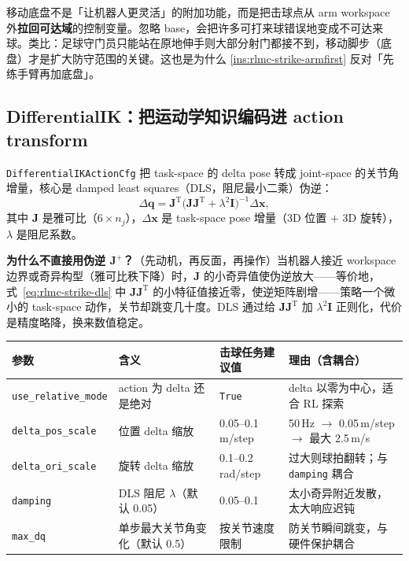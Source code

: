 \begin{insight}[移动底盘是把击球点拉回可达域的控制变量]\label{ins:rlmc-strike-base}
移动底盘不是「让机器人更灵活」的附加功能，而是把击球点从 arm workspace 外\textbf{拉回可达域}的控制变量。忽略 base，会把许多可打来球错误地变成不可达来球。类比：足球守门员只能站在原地伸手则大部分射门都接不到，移动脚步（底盘）才是扩大防守范围的关键。这也是为什么 \cref{ins:rlmc-strike-armfirst} 反对「先练手臂再加底盘」。
\end{insight}

\subsection{DifferentialIK：把运动学知识编码进 action transform}

\verb|DifferentialIKActionCfg| 把 task-space 的 delta pose 转成 joint-space 的关节角增量，核心是 damped least squares（DLS，阻尼最小二乘）伪逆：
\begin{equation}
\Delta\mathbf{q} = \mathbf{J}^{\mathrm{T}}\bigl(\mathbf{J}\mathbf{J}^{\mathrm{T}} + \lambda^{2}\mathbf{I}\bigr)^{-1}\Delta\mathbf{x},
\label{eq:rlmc-strike-dls}
\end{equation}
其中 $\mathbf{J}$ 是雅可比（$6\times n_j$），$\Delta\mathbf{x}$ 是 task-space pose 增量（3D 位置 $+$ 3D 旋转），$\lambda$ 是阻尼系数。

\textbf{为什么不直接用伪逆 $\mathbf{J}^{+}$？}（先动机，再反面，再操作）当机器人接近 workspace 边界或奇异构型（雅可比秩下降）时，$\mathbf{J}$ 的小奇异值使伪逆放大——等价地，式~\eqref{eq:rlmc-strike-dls} 中 $\mathbf{J}\mathbf{J}^{\mathrm{T}}$ 的小特征值接近零，使逆矩阵剧增——策略一个微小的 task-space 动作，关节却跳变几十度。DLS 通过给 $\mathbf{J}\mathbf{J}^{\mathrm{T}}$ 加 $\lambda^{2}\mathbf{I}$ 正则化，代价是精度略降，换来数值稳定。

\begin{center}
\small
\begin{tabular}{@{}llll@{}}
\toprule
参数 & 含义 & 击球任务建议值 & 理由（含耦合） \\
\midrule
\verb|use_relative_mode| & action 为 delta 还是绝对 & \verb|True| & delta 以零为中心，适合 RL 探索 \\
\verb|delta_pos_scale| & 位置 delta 缩放 & 0.05--0.1 m/step & 50\,Hz $\to$ 0.05\,m/step $\to$ 最大 2.5\,m/s \\
\verb|delta_ori_scale| & 旋转 delta 缩放 & 0.1--0.2 rad/step & 过大则球拍翻转；与 \verb|damping| 耦合 \\
\verb|damping| & DLS 阻尼 $\lambda$（默认 0.05） & 0.05--0.1 & 太小奇异附近发散，太大响应迟钝 \\
\verb|max_dq| & 单步最大关节角变化（默认 0.5） & 按关节速度限制 & 防关节瞬间跳变，与硬件保护耦合 \\
\bottomrule
\end{tabular}
\end{center}

